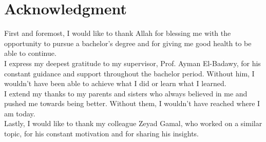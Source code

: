 \chapter*{Acknowledgment}
First and foremost, I would like to thank Allah for blessing me with the opportunity to pursue a bachelor's degree and for giving me good health to be able to continue.\\

I express my deepest gratitude to my supervisor, Prof. Ayman El-Badawy, for his constant guidance and support throughout the bachelor period. Without him, I wouldn't have been able to achieve what I did or learn what I learned. \\

I extend my thanks to my parents and sisters who always believed in me and pushed me towards being better. Without them, I wouldn't have reached where I am today.\\

Lastly, I would like to thank my colleague Zeyad Gamal, who worked on a similar topic, for his constant motivation and for sharing his insights.
\clearpage